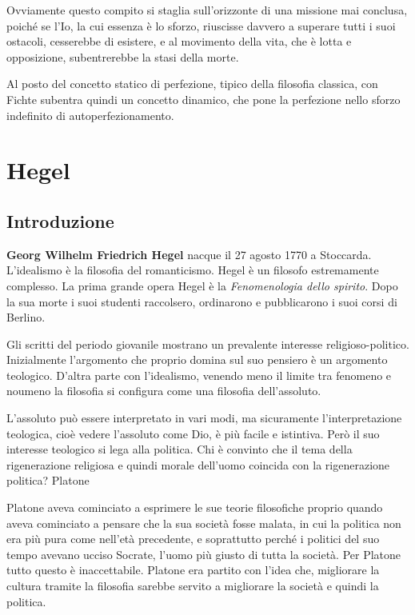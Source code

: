 \documentclass[a4paper, twoside, titlepage]{book}
\begin{document}
Ovviamente questo compito si staglia sull'orizzonte di una missione mai conclusa, poiché se l'Io, la cui essenza è lo sforzo, riuscisse davvero a superare tutti i suoi ostacoli, cesserebbe di esistere, e al movimento della vita, che è lotta e opposizione, subentrerebbe la stasi della morte.

Al posto del concetto statico di perfezione, tipico della filosofia classica, con Fichte subentra quindi un concetto dinamico, che pone la perfezione nello sforzo indefinito di autoperfezionamento.


\part{Hegel}

\chapter{Introduzione}

\textbf{Georg Wilhelm Friedrich Hegel} nacque il 27 agosto 1770 a Stoccarda. L’idealismo è la filosofia del romanticismo. Hegel è un filosofo estremamente complesso. La prima grande opera Hegel è la \textit{Fenomenologia dello spirito}. Dopo la sua morte i suoi studenti raccolsero, ordinarono e pubblicarono i suoi corsi di Berlino.

Gli scritti del periodo giovanile mostrano un prevalente interesse religioso-politico. Inizialmente l'argomento che proprio domina sul suo pensiero è un argomento teologico. D'altra parte con l’idealismo, venendo meno il limite tra fenomeno e noumeno la filosofia si configura come una filosofia dell'assoluto.

L’assoluto può essere interpretato in vari modi, ma sicuramente l'interpretazione teologica, cioè vedere l'assoluto come Dio, è più facile e istintiva. Però il suo interesse teologico si lega alla politica.
Chi è convinto che il tema della rigenerazione religiosa e quindi morale dell'uomo coincida con la rigenerazione politica? Platone

Platone aveva cominciato a esprimere le sue teorie filosofiche proprio quando aveva cominciato a pensare che la sua società fosse malata, in cui la politica non era più pura come nell’età precedente, e soprattutto perché i politici del suo tempo avevano ucciso Socrate, l’uomo più giusto di tutta la società. Per Platone tutto questo è inaccettabile. Platone era partito con l’idea che, migliorare la cultura tramite la filosofia sarebbe servito a migliorare la società e quindi la politica.
\end{document}
